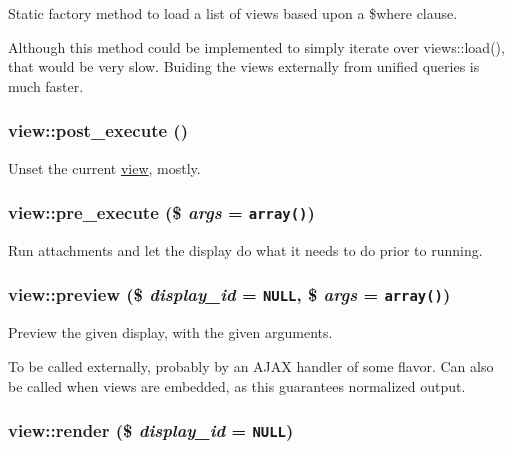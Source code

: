 Static factory method to load a list of views based upon a \$where clause.

Although this method could be implemented to simply iterate over views::load(), that would be very slow. Buiding the views externally from unified queries is much faster. \hypertarget{classview_c541f5588453cd52ce0b5c0e0b3443f4}{
\subsubsection[{post\_\-execute}]{\setlength{\rightskip}{0pt plus 5cm}view::post\_\-execute ()}}
\label{classview_c541f5588453cd52ce0b5c0e0b3443f4}


Unset the current \hyperlink{classview}{view}, mostly. \hypertarget{classview_b3b5984d0d4628552580a2703502f840}{
\subsubsection[{pre\_\-execute}]{\setlength{\rightskip}{0pt plus 5cm}view::pre\_\-execute (\$ {\em args} = {\tt array()})}}
\label{classview_b3b5984d0d4628552580a2703502f840}


Run attachments and let the display do what it needs to do prior to running. \hypertarget{classview_e279461b2f1636e802587901acdf3bd2}{
\subsubsection[{preview}]{\setlength{\rightskip}{0pt plus 5cm}view::preview (\$ {\em display\_\-id} = {\tt NULL}, \/  \$ {\em args} = {\tt array()})}}
\label{classview_e279461b2f1636e802587901acdf3bd2}


Preview the given display, with the given arguments.

To be called externally, probably by an AJAX handler of some flavor. Can also be called when views are embedded, as this guarantees normalized output. \hypertarget{classview_b5ab302afd30f1c6805dc82883a5fdd4}{
\subsubsection[{render}]{\setlength{\rightskip}{0pt plus 5cm}view::render (\$ {\em display\_\-id} = {\tt NULL})}}
\label{classview_b5ab302afd30f1c6805dc82883a5fdd4}



